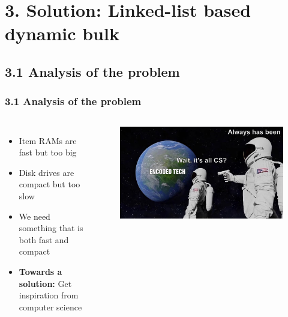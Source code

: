 \documentclass[aspectratio=169]{beamer}
\begin{document}
\section{3. Solution: Linked-list based dynamic bulk}



\subsection{3.1 Analysis of the problem}

\begin{frame}
	\frametitle{3.1 Analysis of the problem}

    \begin{columns}
    \begin{itemize}
		\item Item RAMs are fast but too big
        \item Disk drives are compact but too slow
        \item We need something that is both fast and compact
        \item \textbf{Towards a solution:} Get inspiration from computer science
	\end{itemize}

        
        \begin{figure}
        		\includegraphics[width=1\textwidth]{meme.png}
        \end{figure}
    \end{columns}
\end{frame}
\end{document}
